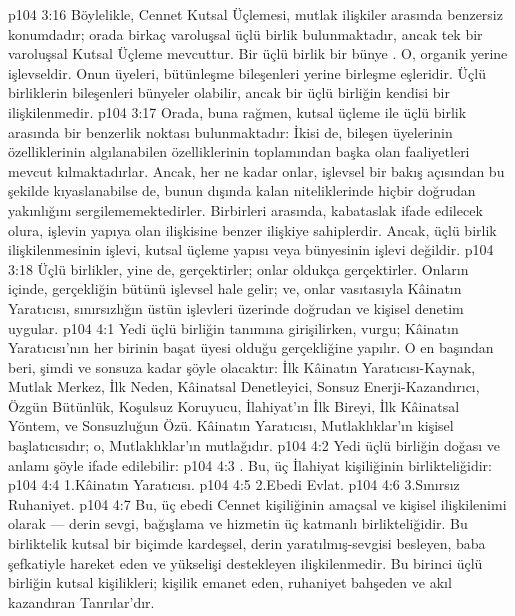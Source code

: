 \vs p104 3:16 Böylelikle, Cennet Kutsal Üçlemesi, mutlak ilişkiler arasında benzersiz konumdadır; orada birkaç varoluşsal üçlü birlik bulunmaktadır, ancak tek bir varoluşsal Kutsal Üçleme mevcuttur. Bir üçlü birlik bir bünye . O, organik yerine işlevseldir. Onun üyeleri, bütünleşme bileşenleri yerine birleşme eşleridir. Üçlü birliklerin bileşenleri bünyeler olabilir, ancak bir üçlü birliğin kendisi bir ilişkilenmedir.
\vs p104 3:17 Orada, buna rağmen, kutsal üçleme ile üçlü birlik arasında bir benzerlik noktası bulunmaktadır: İkisi de, bileşen üyelerinin özelliklerinin algılanabilen özelliklerinin toplamından başka olan faaliyetleri mevcut kılmaktadırlar. Ancak, her ne kadar onlar, işlevsel bir bakış açısından bu şekilde kıyaslanabilse de, bunun dışında kalan niteliklerinde hiçbir doğrudan yakınlığını sergilememektedirler. Birbirleri arasında, kabataslak ifade edilecek olura, işlevin yapıya olan ilişkisine benzer ilişkiye sahiplerdir. Ancak, üçlü birlik ilişkilenmesinin işlevi, kutsal üçleme yapısı veya bünyesinin işlevi değildir.
\vs p104 3:18 Üçlü birlikler, yine de, gerçektirler; onlar oldukça gerçektirler. Onların içinde, gerçekliğin bütünü işlevsel hale gelir; ve, onlar vasıtasıyla Kâinatın Yaratıcısı, sınırsızlığın üstün işlevleri üzerinde doğrudan ve kişisel denetim uygular.
\vs p104 4:1 Yedi üçlü birliğin tanımına girişilirken, vurgu; Kâinatın Yaratıcısı’nın her birinin başat üyesi olduğu gerçekliğine yapılır. O en başından beri, şimdi ve sonsuza kadar şöyle olacaktır: İlk Kâinatın Yaratıcısı\hyp{}Kaynak, Mutlak Merkez, İlk Neden, Kâinatsal Denetleyici, Sonsuz Enerji\hyp{}Kazandırıcı, Özgün Bütünlük, Koşulsuz Koruyucu, İlahiyat’ın İlk Bireyi, İlk Kâinatsal Yöntem, ve Sonsuzluğun Özü. Kâinatın Yaratıcısı, Mutlaklıklar’ın kişisel başlatıcısıdır; o, Mutlaklıklar’ın mutlağıdır.
\vs p104 4:2 Yedi üçlü birliğin doğası ve anlamı şöyle ifade edilebilir:
\vs p104 4:3 . Bu, üç İlahiyat kişiliğinin birlikteliğidir:
\vs p104 4:4 1.\bibnobreakspace Kâinatın Yaratıcısı.
\vs p104 4:5 2.\bibnobreakspace Ebedi Evlat.
\vs p104 4:6 3.\bibnobreakspace Sınırsız Ruhaniyet.
\vs p104 4:7 Bu, üç ebedi Cennet kişiliğinin amaçsal ve kişisel ilişkilenimi olarak --- derin sevgi, bağışlama ve hizmetin üç katmanlı birlikteliğidir. Bu birliktelik kutsal bir biçimde kardeşsel, derin yaratılmış\hyp{}sevgisi besleyen, baba şefkatiyle hareket eden ve yükselişi destekleyen ilişkilenmedir. Bu birinci üçlü birliğin kutsal kişilikleri; kişilik emanet eden, ruhaniyet bahşeden ve akıl kazandıran Tanrılar’dır.
